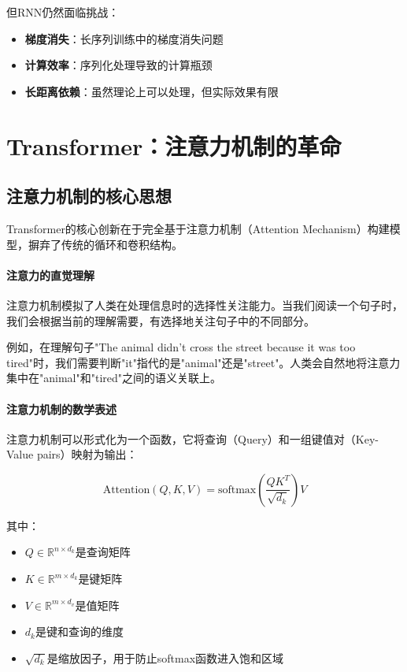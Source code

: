 但RNN仍然面临挑战：
\begin{itemize}
\item \textbf{梯度消失}：长序列训练中的梯度消失问题
\item \textbf{计算效率}：序列化处理导致的计算瓶颈
\item \textbf{长距离依赖}：虽然理论上可以处理，但实际效果有限
\end{itemize}

\section{Transformer：注意力机制的革命}

\subsection{注意力机制的核心思想}

Transformer的核心创新在于完全基于注意力机制（Attention Mechanism）构建模型，摒弃了传统的循环和卷积结构。

\paragraph{注意力的直觉理解}
注意力机制模拟了人类在处理信息时的选择性关注能力。当我们阅读一个句子时，我们会根据当前的理解需要，有选择地关注句子中的不同部分。

例如，在理解句子"The animal didn't cross the street because it was too tired"时，我们需要判断"it"指代的是"animal"还是"street"。人类会自然地将注意力集中在"animal"和"tired"之间的语义关联上。

\paragraph{注意力机制的数学表述}
注意力机制可以形式化为一个函数，它将查询（Query）和一组键值对（Key-Value pairs）映射为输出：

$$\text{Attention}(Q, K, V) = \text{softmax}\left(\frac{QK^T}{\sqrt{d_k}}\right)V$$

其中：
\begin{itemize}
\item $Q \in \mathbb{R}^{n \times d_k}$是查询矩阵
\item $K \in \mathbb{R}^{m \times d_k}$是键矩阵  
\item $V \in \mathbb{R}^{m \times d_v}$是值矩阵
\item $d_k$是键和查询的维度
\item $\sqrt{d_k}$是缩放因子，用于防止softmax函数进入饱和区域
\end{itemize}

